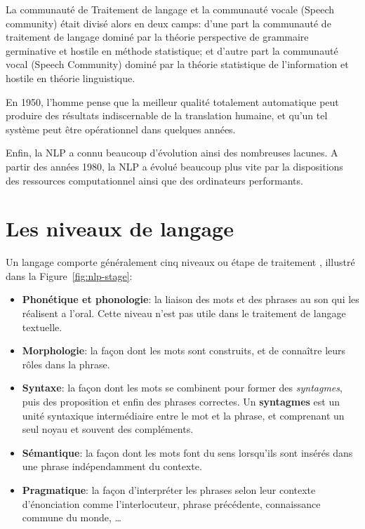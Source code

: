La communauté de Traitement de langage et la communauté vocale (Speech community) était divisé alors en deux camps: d'une part la communauté de traitement de langage dominé par la théorie perspective de grammaire germinative et hostile en méthode statistique; et d'autre part la communauté vocal (Speech Community) dominé par la théorie statistique de l'information et hostile en théorie linguistique.

En 1950, l'homme pense que la meilleur qualité totalement automatique peut produire des résultats indiscernable de la translation humaine, et qu'un tel système peut être opérationnel dans quelques années.

Enfin, la NLP a connu beaucoup d'évolution ainsi des nombreuses lacunes. A partir des années 1980, la NLP a évolué beaucoup plus vite par la dispositions des ressources computationnel ainsi que des ordinateurs performants.

\section{Les niveaux de langage}
Un langage comporte généralement cinq niveaux ou étape de traitement \citep*{automatic-nlp, handbook-nlp}, illustré dans la Figure~\ref{fig:nlp-stage}:
\begin{itemize}
    \item \textbf{Phonétique et phonologie}: la liaison des mots et des phrases au son qui les réalisent a l'oral. Cette niveau n'est pas utile dans le traitement de langage textuelle.
    \item \textbf{Morphologie}: la façon dont les mots sont construits, et de connaître leurs rôles dans la phrase.
    \item \textbf{Syntaxe}: la façon dont les mots se combinent pour former des \textit{syntagmes}, puis des proposition et enfin des phrases correctes. Un \textbf{syntagmes} est un unité syntaxique intermédiaire entre le mot et la phrase, et comprenant un seul noyau et souvent des compléments.
    \item \textbf{Sémantique}: la façon dont les mots font du sens lorsqu'ils sont insérés dans une phrase indépendamment du contexte.
    \item \textbf{Pragmatique}: la façon d’interpréter les phrases selon leur contexte d'énonciation comme l'interlocuteur, phrase précédente, connaissance commune du monde, \dots
\end{itemize}

